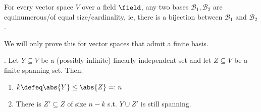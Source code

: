\begin{theorem}\label{thm:basesofequalcardinality}
    For every vector space $V$ over a field $\field$, any two bases $\mathcal{B}_1,\mathcal{B}_2$ are equinumerous/of equal size/cardinality, ie, there is a bijection between $\mathcal{B}_1$ and $\mathcal{B}_2$.
\end{theorem}

\begin{remark}
    We will only prove this for vector spaces that admit a finite basis.
\end{remark}

\begin{lemma}\label{lemma:steinitz}
     . Let $Y \subseteq V$ be a (possibly infinite) linearly independent set and let $Z \subseteq V$ be a finite spanning set. Then:
    \begin{enumerate}
        \item $k\defeq\abs{Y} \leq \abs{Z} =: n$
        \item There is $Z' \subseteq Z$ of size $n -k$ s.t. $Y \cup Z'$ is still spanning.
    \end{enumerate}
\end{lemma}

